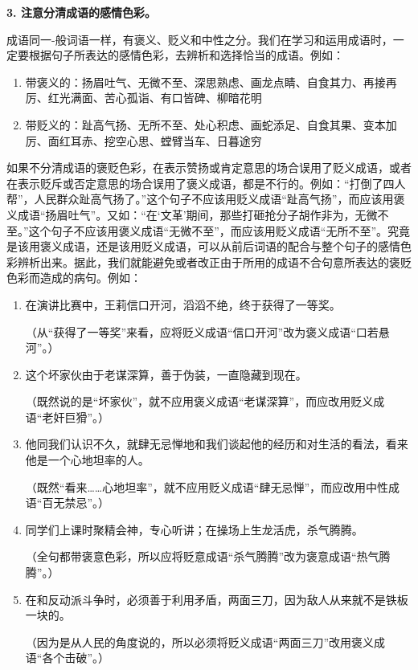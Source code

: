 \textbf{3. 注意分清成语的感情色彩。}

成语同一-般词语一样，有褒义、贬义和中性之分。我们在学习和运用成语时，一定要根据句子所表达的感情色彩，去辨析和选择恰当的成语。例如：
\begin{enumerate}
\item 带褒义的：扬眉吐气、无微不至、深思熟虑、画龙点睛、自食其力、再接再厉、红光满面、苦心孤诣、有口皆碑、柳暗花明

\item 带贬义的：趾高气扬、无所不至、处心积虑、画蛇添足、自食其果、变本加厉、面红耳赤、挖空心思、螳臂当车、日暮途穷
\end{enumerate}

如果不分清成语的褒贬色彩，在表示赞扬或肯定意思的场合误用了贬义成语，或者在表示贬斥或否定意思的场合误用了褒义成语，都是不行的。例如：“打倒了四人帮”，人民群众趾高气扬了。”这个句子不应该用贬义成语“趾高气扬”，而应该用褒义成语“扬眉吐气”。又如：“在‘文革’期间，那些打砸抢分子胡作非为，无微不至。”这个句子不应该用褒义成语“无微不至”，而应该用贬义成语“无所不至”。究竟是该用褒义成语，还是该用贬义成语，可以从前后词语的配合与整个句子的感情色彩辨析出来。据此，我们就能避免或者改正由于所用的成语不合句意所表达的褒贬色彩而造成的病句。例如：

\begin{enumerate}
\item 在演讲比赛中，王莉信口开河，滔滔不绝，终于获得了一等奖。

（从“获得了一等奖”来看，应将贬义成语“信口开河”改为褒义成语“口若悬河”。）

\item 这个坏家伙由于老谋深算，善于伪装，一直隐藏到现在。

（既然说的是“坏家伙”，就不应用褒义成语“老谋深算”，而应改用贬义成语“老奸巨猾”。）

\item 他同我们认识不久，就肆无忌惮地和我们谈起他的经历和对生活的看法，看来他是一个心地坦率的人。

（既然“看来……心地坦率”，就不应用贬义成语“肆无忌惮”，而应改用中性成语“百无禁忌”。）

\item 同学们上课时聚精会神，专心听讲；在操场上生龙活虎，杀气腾腾。

（全句都带褒意色彩，所以应将贬意成语“杀气腾腾”改为褒意成语“热气腾腾”。）

\item 在和反动派斗争时，必须善于利用矛盾，两面三刀，因为敌人从来就不是铁板一块的。

（因为是从人民的角度说的，所以必须将贬义成语“两面三刀”改用褒义成语“各个击破”。）
\end{enumerate}

